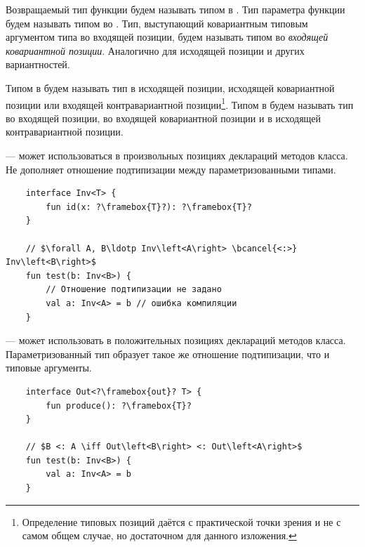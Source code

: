 \begin{definition}
    \label{def:type-positions}
    Возвращаемый тип функции будем называть типом в .
    Тип параметра функции будем называть типом во .
    Тип, выступающий ковариантным типовым аргументом типа во входящей позиции, будем называть типом во \emph{входящей ковариантной позиции}.
    Аналогично для исходящей позиции и других вариантностей.
\end{definition}

\begin{definition}
    \label{def:type-position-sign}
    Типом в  будем называть тип в исходящей позиции, исходящей ковариантной позиции или входящей контравариантной позиции\footnote{Определение типовых позиций даётся с практической точки зрения и не с самом общем случае, но достаточном для данного изложения.}.
    Типом в  будем называть тип во входящей позиции, во входящей ковариантной позиции и в исходящей контравариантной позиции.
\end{definition}

\begin{definition}
    \label{def:invariant}
     --- может использоваться в произвольных позициях деклараций методов класса.
    Не дополняет отношение подтипизации между параметризованными типами.
\end{definition}

\begin{verbatim}
    interface Inv<T> {
        fun id(x: ?\framebox{T}?): ?\framebox{T}?
    }

    // $\forall A, B\ldotp Inv\left<A\right> \bcancel{<:>} Inv\left<B\right>$
    fun test(b: Inv<B>) {
        // Отношение подтипизации не задано
        val a: Inv<A> = b // ошибка компиляции
    }
\end{verbatim}

\begin{definition}
    \label{def:covariant}
     --- может использовать в положительных позициях деклараций методов класса.
    Параметризованный тип образует такое же отношение подтипизации, что и типовые аргументы.
\end{definition}

\begin{verbatim}
    interface Out<?\framebox{out}? T> {
        fun produce(): ?\framebox{T}?
    }

    // $B <: A \iff Out\left<B\right> <: Out\left<A\right>$
    fun test(b: Inv<B>) {
        val a: Inv<A> = b
    }
\end{verbatim}

